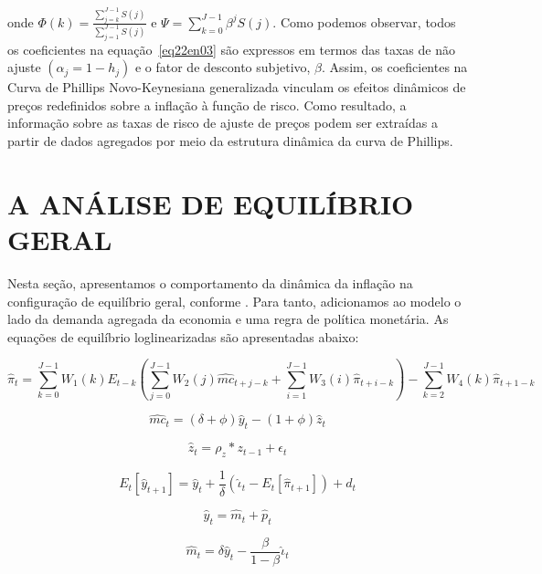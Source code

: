 \documentclass[twoside,a4paper,11pt]{report}
\begin{document}
\noindent onde $\Phi(k)=\frac{\sum _{j=k}^{J-1}{S(j)}}{\sum _{j=1}^{J-1}{S(j)}}$ e $\Psi =\sum _{k=0}^{J-1}{{\beta}^{j}S(j)}$. Como podemos observar, todos os coeficientes na equação~\ref{eq22en03} são expressos em termos das taxas de não ajuste $({\alpha}_{j}=1-{h}_{j})$ e o fator de desconto subjetivo, $\beta$. Assim, os coeficientes na Curva de Phillips Novo-Keynesiana generalizada vinculam os efeitos dinâmicos de preços redefinidos sobre a inflação à função de risco. Como resultado, a informação sobre as taxas de risco de ajuste de preços podem ser extraídas a partir de dados agregados por meio da estrutura dinâmica da curva de Phillips.

\section*{A ANÁLISE DE EQUILÍBRIO GERAL}

Nesta seção, apresentamos o comportamento da dinâmica da inflação na configuração de equilíbrio geral, conforme \citet{yao2010can}. Para tanto, adicionamos ao modelo o lado da demanda agregada da economia e uma regra de política monetária. As equações de equilíbrio loglinearizadas são apresentadas abaixo:

\begin{equation}\label{eq23en03}
{\hat{\pi}}_{t}=\sum_{k=0}^{J-1}{{W}_{1}(k)}{E}_{t-k}(\sum_{j=0}^{J-1}{{W}_{2}(j){\hat{mc}}_{t+j-k}+\sum_{i=1}^{J-1}{{W}_{3}(i){\hat{\pi}}_{t+i-k}}})-\sum_{k=2}^{J-1}{{W}_{4}(k){\hat{\pi}}_{t+1-k}} 
\end{equation}

\begin{equation}\label{eq24en03}
{\hat{mc}}_{t}=(\delta +\phi){\hat{y}}_{t}-(1+\phi){\hat{z}}_{t}
\end{equation}

\begin{equation}\label{eq25en03}
{\hat{z}}_{t}={\rho}_{z}\ast {z}_{t-1}+{\epsilon}_{t}
\end{equation}

\begin{equation}\label{eq26en03}
{E}_{t}[{\hat{y}}_{t+1}]={\hat{y}}_{t}+\frac{1}{\delta}({\hat{\iota}}_{t}-{E}_{t}[{\hat{\pi}}_{t+1}])+{d}_{t}
\end{equation}

\begin{equation}\label{eq27en03}
{\hat{y}}_{t} = \hat{m}_{t}+\hat{p}_{t}
\end{equation}

\begin{equation}\label{eq28en03}
\hat{m}_{t} = {\delta}{\hat{y}}_{t} - \frac{\beta}{1- \beta}{\hat{\iota}_{t}}
\end{equation}
\end{document}
